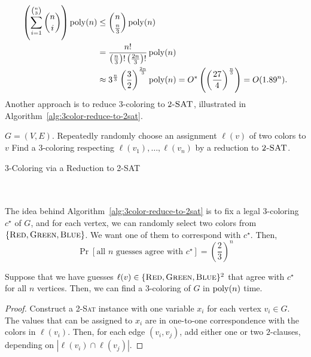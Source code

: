         \begin{align*}
            \left(\sum_{i=1}^{\binom{n}{3}} \binom{n}{i}\right)\operatorname{poly}(n)&\leq \binom{n}{\frac{n}{3}}\operatorname{poly}(n) \\
            &=\frac{n!}{\left(\frac{n}{3}\right)!\left(\frac{2n}{3}\right)!}\operatorname{poly}(n) \\
            &\approx 3^{\frac{n}{3}}\left(\frac{3}{2}\right)^\frac{2n}{3}\operatorname{poly}(n)=O^*\left(\left(\frac{27}{4}\right)^\frac{n}{3}\right)=O(1.89^n).
        \end{align*}
        Another approach is to reduce \(3\)-coloring to \(2\textsc{-SAT}\), illustrated in Algorithm~\ref{alg:3color-reduce-to-2sat}.
        \begin{algorithm}[H] 
            \begin{algorithmic}[1]
                \Require \(G=(V,E)\).
                        \State Repeatedly randomly choose an assignment \(\ell(v)\) of two colors to \(v\)
                    \EndFor
                    \State Find a \(3\)-coloring respecting \(\ell(v_1),\ldots,\ell(v_n)\) by a reduction to \(\textsc{2-SAT}\).
                \EndProcedure 
            \end{algorithmic}
            \caption{3-Coloring via a Reduction to 2-SAT}
            \label{alg:3color-reduce-to-2sat}
        \end{algorithm}
        \vphantom
        \\
        \\
        The idea behind Algorithm~\ref{alg:3color-reduce-to-2sat} is to fix a legal \(3\)-coloring \(c^\star\) of \(G\), and for each vertex, we can randomly select two colors from \(\{\textsc{Red},\textsc{Green},\textsc{Blue}\}\). We want one of them to correspond with \(c^\star\). Then,
        \begin{equation*}
            \Pr[\text{all }n\text{ guesses agree with }c^\star]=\left(\frac{2}{3}\right)^n
        \end{equation*}
        \begin{lemma*}
            Suppose that we have guesses \(\ell(v)\in \{\textsc{Red},\textsc{Green},\textsc{Blue}\}^2\) that agree with \(c^\star\) for all \(n\) vertices. Then, we can find a \(3\)-coloring of \(G\) in \(\operatorname{poly}(n)\) time.
            \begin{proof}
                Construct a \textsc{2-Sat} instance with one variable \(x_i\) for each vertex \(v_i\in G\). The values that can be assigned to \(x_i\) are in one-to-one correspondence with the colors in \(\ell(v_i)\). Then, for each edge \((v_i,v_j)\), add either one or two \(2\)-clauses, depending on \(|\ell(v_i)\cap\ell(v_j)|\).
            \end{proof}
        \end{lemma*}
